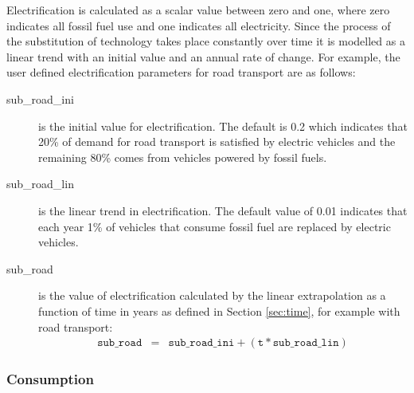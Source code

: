 \documentclass[notitlepage,a4paper]{article}
\begin{document}
Electrification is calculated as a scalar value between zero and one, where zero indicates all fossil fuel use and one indicates all electricity. Since the process of the substitution of technology takes place constantly over time it is modelled as a linear trend with an initial value and an annual rate of change. For example, the user defined electrification parameters for road transport are as follows:

\begin{description}
\item[sub\_road\_ini] is the initial value for electrification.  The default is 0.2 which indicates that 20\% of demand for road transport is satisfied by electric vehicles and the remaining 80\% comes from vehicles powered by fossil fuels.
\item[sub\_road\_lin] is the linear trend in electrification. The default value of 0.01 indicates that each year 1\% of vehicles that consume fossil fuel are replaced by electric vehicles. 
\item[sub\_road] is the value of electrification calculated by the linear extrapolation as a function of time in years as defined in Section \ref{sec:time}, for example with road transport:
\begin{eqnarray}
\texttt{sub\_road} &=& \texttt{sub\_road\_ini} + (\texttt{t} * \texttt{sub\_road\_lin}) 
\end{eqnarray}
\end{description}


\subsubsection{Consumption}
\end{document}
